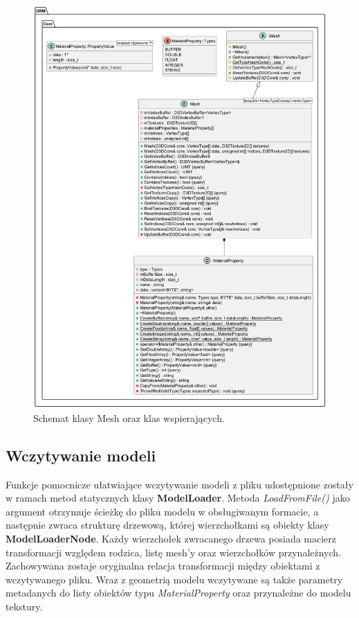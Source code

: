 	\begin{figure}[h!]
		\centering
		\includegraphics[width=\textwidth]{images/UML/mesh.png}
		\caption{Schemat klasy Mesh oraz klas wspierających.}
		\label{UML_Mesh}
	\end{figure}
	
		
	\vfill
	\clearpage
	
\subsection{Wczytywanie modeli}
	Funkcje pomocnicze ułatwiające wczytywanie modeli z pliku udostępnione zostały w ramach metod statycznych klasy \textbf{ModelLoader}. Metoda \textit{LoadFromFile()} jako argument otrzymuje ścieżkę do pliku modelu w obsługiwanym formacie, a następnie zwraca strukturę drzewową, której wierzchołkami są obiekty klasy \textbf{ModelLoaderNode}. Każdy wierzchołek zwracanego drzewa posiada macierz transformacji względem rodzica, listę mesh'y oraz wierzchołków przynależnych. Zachowywana zostaje oryginalna relacja transformacji między obiektami z wczytywanego pliku.
	Wraz z geometrią modelu wczytywane są także parametry metadanych do listy obiektów typu \textit{MaterialProperty} oraz przynależne do modelu tekstury. 
	
